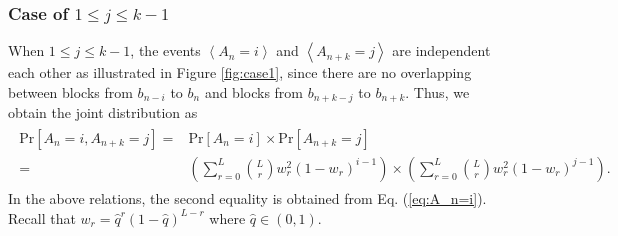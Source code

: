 \documentclass[dvipdfmx,english]{ampmt} %
\begin{document}
\subsubsection{Case of $1 \leq j \leq k-1$}
When $1 \leq j \leq k-1$, the events $\left< A_n=i \right>$ and $\left< A_{n+k}=j \right>$ are independent each other as illustrated in Figure \ref{fig:case1}, since there are no overlapping between blocks from $b_{n-i}$ to $b_{n}$ and blocks from $b_{n+k-j}$ to $b_{n+k}$. Thus, we obtain the joint distribution as
\begin{align}
\begin{split}
  \label{eq:joint1}
  \mathrm{Pr}[A_n=i, A_{n+k}=j] =& \mathrm{Pr}[A_n=i] \times \mathrm{Pr}[A_{n+k}=j]\\
  =&\left( \sum_{r=0}^{L} \binom{L}{r}w_r^2 (1-w_r)^{i-1} \right) \times \left( \sum_{r=0}^{L} \binom{L}{r}w_r^2 (1-w_r)^{j-1} \right).
  \end{split}
\end{align}
In the above relations, the second equality is obtained from Eq. (\ref{eq:A_n=i}). Recall that $w_r = \hat{q}^r(1-\hat{q})^{L-r}$ where $\hat{q} \in (0,1)$.
\end{document}
